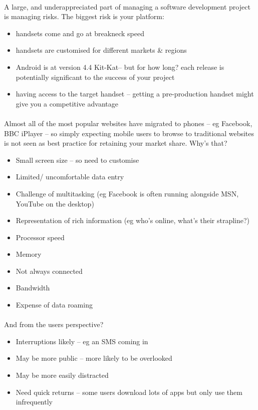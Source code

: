 \paragraph{} A large, and underappreciated part of managing a software development project is managing risks. The biggest risk is your platform:
\begin{itemize}
\item handsets come and go at breakneck speed
\item handsets are customised for different markets \& regions
\item Android is at version 4.4 Kit-Kat– but for how long? each release is potentially significant to the success of your project
\item having access to the target handset – getting a pre-production handset might give you a competitive advantage
\end{itemize}

\paragraph{} Almost all of the most popular websites have migrated to phones – eg Facebook, BBC iPlayer – so simply expecting mobile users to browse to traditional websites is not seen as best practice for retaining your market share. Why's that?

\begin{itemize}
\item Small screen size – so need to customise
\item Limited/ uncomfortable data entry
\item Challenge of multitasking (eg Facebook is often running alongside MSN, YouTube on the desktop)
\item Representation of rich information (eg who's online, what's their strapline?)
\item Processor speed
\item Memory
\item Not always connected
\item Bandwidth
\item Expense of data roaming
\end{itemize}

\paragraph{} And from the users perspective?

\begin{itemize}
\item Interruptions likely – eg an SMS coming in
\item May be more public – more likely to be overlooked
\item May be more easily distracted
\item Need quick returns – some users download lots of apps but only use them infrequently
\end{itemize}

